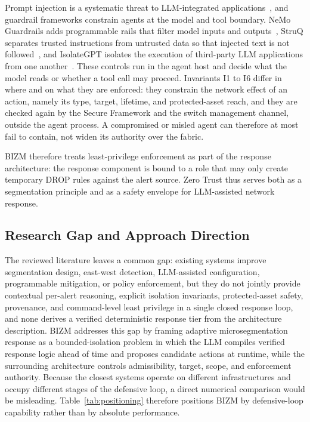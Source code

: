 \documentclass[final,5p]{elsarticle}
\begin{document}
Prompt injection is a systematic threat to LLM-integrated applications~\cite{liu2024promptinjection}, and guardrail frameworks constrain agents at the model and tool boundary. NeMo Guardrails adds programmable rails that filter model inputs and outputs~\cite{rebedea2023nemo}, StruQ separates trusted instructions from untrusted data so that injected text is not followed~\cite{chen2025struq}, and IsolateGPT isolates the execution of third-party LLM applications from one another~\cite{wu2025isolategpt}. These controls run in the agent host and decide what the model reads or whether a tool call may proceed. Invariants I1 to I6 differ in where and on what they are enforced: they constrain the network effect of an action, namely its type, target, lifetime, and protected-asset reach, and they are checked again by the Secure Framework and the switch management channel, outside the agent process. A compromised or misled agent can therefore at most fail to contain, not widen its authority over the fabric.

BIZM therefore treats least-privilege enforcement as part of the response architecture: the response component is bound to a role that may only create temporary DROP rules against the alert source. Zero Trust thus serves both as a segmentation principle and as a safety envelope for LLM-assisted network response.

\subsection{Research Gap and Approach Direction}
\label{sec:rw_gap}

The reviewed literature leaves a common gap: existing systems improve segmentation design, east-west detection, LLM-assisted configuration, programmable mitigation, or policy enforcement, but they do not jointly provide contextual per-alert reasoning, explicit isolation invariants, protected-asset safety, provenance, and command-level least privilege in a single closed response loop, and none derives a verified deterministic response tier from the architecture description. BIZM addresses this gap by framing adaptive microsegmentation response as a bounded-isolation problem in which the LLM compiles verified response logic ahead of time and proposes candidate actions at runtime, while the surrounding architecture controls admissibility, target, scope, and enforcement authority. Because the closest systems operate on different infrastructures and occupy different stages of the defensive loop, a direct numerical comparison would be misleading. Table~\ref{tab:positioning} therefore positions BIZM by defensive-loop capability rather than by absolute performance.
\end{document}
